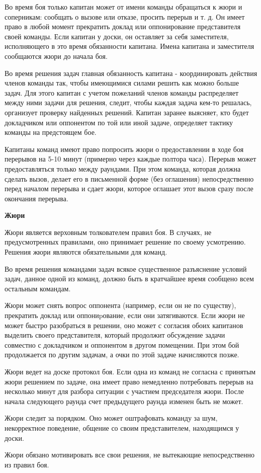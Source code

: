 \documentclass{article}
\begin{document}
Во время боя только капитан может от имени команды обращаться к жюри и соперникам: сообщать о вызове или отказе, просить перерыв и т. д. Он имеет право в любой момент прекратить доклад или оппонирование представителя своей команды. Если капитан у доски, он оставляет за себя заместителя, исполняющего в это время обязанности капитана. Имена капитана и заместителя сообщаются жюри до начала боя.

Во время решения задач главная обязанность капитана - координировать действия членов команды так, чтобы имеющимися силами решить как можно больше задач. Для этого капитан с учетом пожеланий членов команды распределяет между ними задачи для решения, следит, чтобы каждая задача кем-то решалась, организует проверку найденных решений. Капитан заранее выясняет, кто будет докладчиком или оппонентом по той или иной задаче, определяет тактику команды на предстоящем бое.

Капитаны команд имеют право попросить жюри о предоставлении в ходе боя перерывов на 5-10 минут (примерно через каждые полтора часа). Перерыв может предоставляться только между раундами. При этом команда, которая должна сделать вызов, делает его в письменной форме (без оглашения) непосредственно перед началом перерыва и сдает жюри, которое оглашает этот вызов сразу после окончания перерыва.

\begin{center}
\textbf{Жюри}
\end{center}

Жюри является верховным толкователем правил боя. В случаях, не предусмотренных правилами, оно принимает решение по своему усмотрению. Решения жюри являются обязательными для команд.

Во время решения командами задач всякое существенное разъяснение условий задач, данное одной из команд, должно быть в кратчайшее время сообщено всем остальным командам.

Жюри может снять вопрос оппонента (например, если он не по существу), прекратить доклад или оппониpование, если они затягиваются. Если жюри не может быстро разобраться в решении, оно может с согласия обоих капитанов выделить своего представителя, который продолжит обсуждение задачи совместно с докладчиком и оппонентом в другом помещении. При этом бой продолжается по другим задачам, а очки по этой задаче начисляются позже.

Жюри ведет на доске протокол боя. Если одна из команд не согласна с принятым жюри решением по задаче, она имеет право немедленно потребовать перерыв на несколько минут для разбора ситуации с участием председателя жюри. После начала следующего раунда счет предыдущего раунда изменен быть не может.

Жюри следит за порядком. Оно может оштрафовать команду за шум, некорректное поведение, общение со своим представителем, находящимся у доски.

Жюри обязано мотивировать все свои решения, не вытекающие непосредственно из правил боя. 
\end{document}
